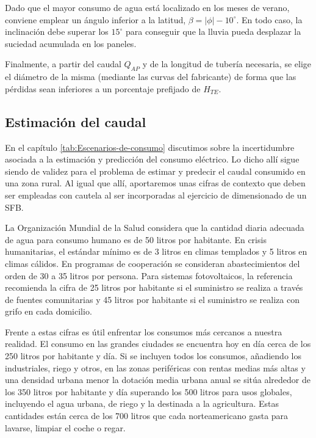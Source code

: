 Dado que el mayor consumo de agua está localizado en los meses de
verano, conviene emplear un ángulo inferior a la latitud,
$\beta=|\phi|-10^{\circ}$.  En todo caso, la inclinación debe superar
los $15^{\circ}$ para conseguir que la lluvia pueda desplazar la
suciedad acumulada en los paneles.

Finalmente, a partir del caudal $Q_{AP}$ y de la longitud de tubería
necesaria, se elige el diámetro de la misma (mediante las curvas del
fabricante) de forma que las pérdidas sean inferiores a un porcentaje
prefijado de $H_{TE}$.


\subsection{Estimación del caudal}

En el capítulo \ref{tab:Escenarios-de-consumo} discutimos sobre la
incertidumbre asociada a la estimación y predicción del consumo eléctrico.
Lo dicho allí sigue siendo de validez para el problema de estimar
y predecir el caudal consumido en una zona rural. Al igual que allí,
aportaremos unas cifras de contexto que deben ser empleadas con cautela
al ser incorporadas al ejercicio de dimensionado de un SFB. 

La Organización Mundial de la Salud considera que la cantidad diaria
adecuada de agua para consumo humano es de 50 litros por habitante.
En crisis humanitarias, el estándar mínimo es de 3 litros en climas
templados y 5 litros en climas cálidos. En programas de cooperación
se consideran abastecimientos del orden de 30 a 35 litros por persona.
Para sistemas fotovoltaicos, la referencia \cite{Narvarte.Lorenzo2006}
recomienda la cifra de 25 litros por habitante si el suministro se
realiza a través de fuentes comunitarias y 45 litros por habitante
si el suministro se realiza con grifo en cada domicilio.

Frente a estas cifras es útil enfrentar los consumos más cercanos
a nuestra realidad. El consumo en las grandes ciudades se encuentra
hoy en día cerca de los 250 litros por habitante y día. Si se incluyen
todos los consumos, añadiendo los industriales, riego y otros, en
las zonas periféricas con rentas medias más altas y una densidad urbana
menor la dotación media urbana anual se sitúa alrededor de los 350
litros por habitante y día superando los 500 litros para usos globales,
incluyendo el agua urbana, de riego y la destinada a la agricultura.
Estas cantidades están cerca de los 700 litros que cada norteamericano
gasta para lavarse, limpiar el coche o regar.

